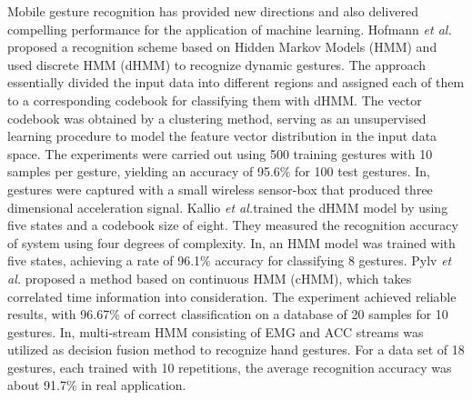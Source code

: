 \documentclass[review]{elsarticle}
\newcommand{\etal}{\textit{et al.}}
\begin{document}
{Mobile gesture recognition has provided new directions and also delivered compelling performance for the application of machine learning. Hofmann \etal\;\cite{hofmann1998velocity} proposed a recognition scheme based on Hidden Markov Models (HMM)\;\cite{markov} and used discrete HMM (dHMM) to recognize dynamic gestures. The approach essentially divided the input data into different regions and assigned each of them to a corresponding codebook for classifying them with dHMM. The vector codebook was obtained by a clustering method, serving as an unsupervised learning procedure to model the feature vector distribution in the input data space. The experiments were carried out using 500 training gestures with 10 samples per gesture, yielding an accuracy of 95.6\% for 100 test gestures.} In\;\cite{kallio2003online}, gestures were captured with a small wireless sensor-box that produced three dimensional acceleration signal. Kallio \etal trained the dHMM model by using five states and a codebook size of eight. They {measured} the recognition accuracy of system using four degrees of complexity. In\;\cite{kela2006accelerometer-based}, an HMM model was trained with five states, achieving a rate of 96.1\% accuracy for classifying 8 gestures. Pylv \etal\;\cite{pylvanainen2005accelerometer} proposed a method based on continuous HMM (cHMM), which takes correlated time information into consideration. The experiment achieved reliable results, with 96.67\% of correct classification on a database of 20 samples for 10 gestures. In\;\cite{Zhang2009Hand}, multi-stream HMM consisting of EMG and ACC streams was utilized as decision fusion method to recognize hand gestures. For a data set of 18 gestures, each trained with 10 repetitions, the average recognition accuracy was about 91.7\% in real application.
\end{document}
